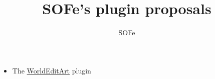 \documentclass{article}
\title{SOFe's plugin proposals}
\author{SOFe}
\begin{document}
	\maketitle
	\begin{itemize}
		\item The \href{run:./WorldEditArt}{WorldEditArt} plugin
	\end{itemize}
\end{document}

